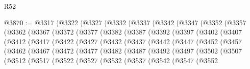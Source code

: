 \begin{lexlean}{R52}
\begin{coremodule}
@3870 := @3317
    (@3322
      (@3327
        (@3332
          (@3337
            (@3342
              (@3347
                (@3352
                  (@3357
                    (@3362
                      (@3367
                        (@3372
                          (@3377
                            (@3382
                              (@3387
                                (@3392
                                  (@3397
                                    (@3402
                                      (@3407
                                        (@3412
                                          (@3417
                                            (@3422
                                              (@3427
                                                (@3432
                                                  (@3437
                                                    (@3442
                                                      (@3447
                                                        (@3452
                                                          (@3457
                                                            (@3462
                                                              (@3467
                                                                (@3472
                                                                  (@3477
                                                                    (@3482
                                                                      (@3487
                                                                        (@3492
                                                                          (@3497
                                                                            (@3502
                                                                              (@3507
                                                                                (@3512
                                                                                  (@3517
                                                                                    (@3522
                                                                                      (@3527
                                                                                        (@3532
                                                                                          (@3537
                                                                                            (@3542
                                                                                              (@3547
                                                                                                (@3552

\end{coremodule}
\end{lexlean}

